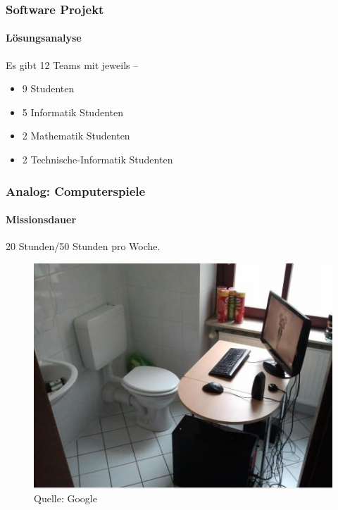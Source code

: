 \documentclass[•]{beamer}
\begin{document}
\begin{frame}
	\frametitle{Software Projekt}
	\framesubtitle{L\"osungsanalyse}
	Es gibt 12 Teams mit jeweils  --\\
	\begin{itemize}
	\item 9 Studenten
	\item 5 Informatik Studenten
	\item 2 Mathematik Studenten
	\item 2 Technische-Informatik Studenten
	\end{itemize}
\end{frame}

\begin{frame}
\frametitle{Analog: Computerspiele}
\framesubtitle{Missionsdauer}
\vspace*{10pt}
20 Stunden/50 Stunden pro Woche.\\
 \begin{figure}
	\centering
	\includegraphics[scale=0.6]{gamers}
	\caption*{\scriptsize{Quelle: Google}}
	\end{figure}
\end{frame}
\end{document}
